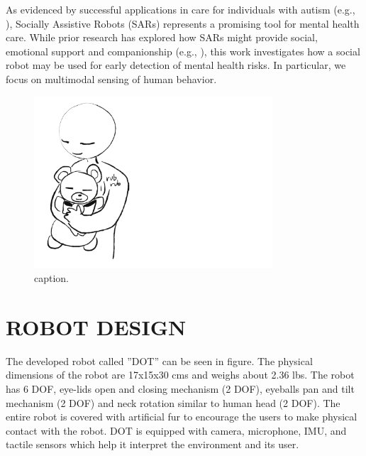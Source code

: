\documentclass[letterpaper, 10 pt, conference]{ieeeconf}  %
\begin{document}
As evidenced by successful applications in care for individuals with autism (e.g., \cite{scassellati2018improving}), Socially Assistive Robots (SARs) \cite{} represents a promising tool for mental health care. %
While prior research has explored how SARs might provide social, emotional support and companionship (e.g., \cite{}), %
this work investigates how a social robot may be used for early detection of mental health risks. In particular, we focus on multimodal sensing of human behavior. %





\begin{figure}[t!]
\centering
\includegraphics[width=3.5in]{teaser.pdf}
\vskip -10pt
\caption{caption.}
\label{fig:teaser}
\end{figure}

\section{ROBOT DESIGN}

The developed robot called ''DOT'' can be seen in figure. The physical dimensions of the robot are 17x15x30 cms and weighs about 2.36 lbs. The robot has 6 DOF, eye-lids open and closing mechanism (2 DOF), eyeballs pan and tilt mechanism (2 DOF) and neck rotation similar to human head (2 DOF). The entire robot is covered with artificial fur to encourage the users to make physical contact with the robot. DOT is equipped with camera, microphone, IMU, and tactile sensors which help it interpret the environment and its user.  
\end{document}
